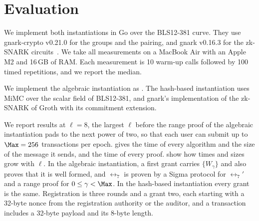 \section{Evaluation}\label{sec:txid-evaluation}

We implement both instantiations in Go over the BLS12-381 curve. They use
gnark-crypto v0.21.0 for the groups and the pairing, and gnark v0.16.3 for the
zk-SNARK circuits~\cite{gnark-crypto}. We take all measurements on a MacBook
Air with an Apple M2 and 16\,GB of RAM. Each measurement is 10 warm-up calls
followed by 100 timed repetitions, and we report the median.

We implement the algebraic instantiation as . The
hash-based instantiation uses MiMC over the scalar field of BLS12-381, and
gnark's implementation of the zk-SNARK of Groth with its commitment
extension.

We report results at $\ell = 8$, the largest $\ell$ before the range proof of
the algebraic instantiation pads to the next power of two, so that each user can submit up to $\Max = 256$
transactions per epoch.  gives the time of every
algorithm and the size of the message it sends, and 
the time of every proof.  show how
times and sizes grow with $\ell$.
In the algebraic instantiation, a first grant carries $\{W_\gamma\}$ and also
proves that it is well formed, and $\rel_7$ is proven by a Sigma protocol for
$\rel_7'$ and a range proof for $0 \leq \gamma < \Max$. In the hash-based
instantiation every grant is the same. Registration is three rounds and a grant
two, each starting with a 32-byte nonce from the registration authority or the
auditor, and a transaction includes a 32-byte payload and its 8-byte length.

